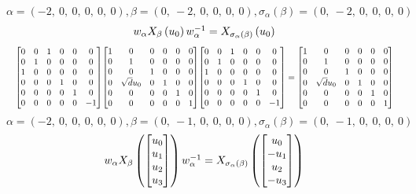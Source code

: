 \documentclass[11pt]{article}
\theoremstyle{definition}
\begin{document}
\[
\alpha = \left( -2, \  0, \  0, \  0, \  0, \  0\right), \beta = \left( 0, \  -2, \  0, \  0, \  0, \  0\right), \sigma_{\alpha}(\beta) = \left( 0, \  -2, \  0, \  0, \  0, \  0\right)
\]
\[
\scaletoalign{\textwidth}{w_{\alpha} X_{\beta}\left(u_{0}\right) w_{\alpha}^{-1} = X_{\sigma_{\alpha}\left(\beta\right)}\left(u_{0}\right)}
\]
\[
\scaletoalign{\textwidth}{{\left[\begin{matrix}0 & 0 & 1 & 0 & 0 & 0\\0 & 1 & 0 & 0 & 0 & 0\\1 & 0 & 0 & 0 & 0 & 0\\0 & 0 & 0 & 1 & 0 & 0\\0 & 0 & 0 & 0 & 1 & 0\\0 & 0 & 0 & 0 & 0 & -1\end{matrix}\right]} {\left[\begin{matrix}1 & 0 & 0 & 0 & 0 & 0\\0 & 1 & 0 & 0 & 0 & 0\\0 & 0 & 1 & 0 & 0 & 0\\0 & \sqrt{d} u_{0} & 0 & 1 & 0 & 0\\0 & 0 & 0 & 0 & 1 & 0\\0 & 0 & 0 & 0 & 0 & 1\end{matrix}\right]} {\left[\begin{matrix}0 & 0 & 1 & 0 & 0 & 0\\0 & 1 & 0 & 0 & 0 & 0\\1 & 0 & 0 & 0 & 0 & 0\\0 & 0 & 0 & 1 & 0 & 0\\0 & 0 & 0 & 0 & 1 & 0\\0 & 0 & 0 & 0 & 0 & -1\end{matrix}\right]} = {\left[\begin{matrix}1 & 0 & 0 & 0 & 0 & 0\\0 & 1 & 0 & 0 & 0 & 0\\0 & 0 & 1 & 0 & 0 & 0\\0 & \sqrt{d} u_{0} & 0 & 1 & 0 & 0\\0 & 0 & 0 & 0 & 1 & 0\\0 & 0 & 0 & 0 & 0 & 1\end{matrix}\right]}}
\]
\[
\alpha = \left( -2, \  0, \  0, \  0, \  0, \  0\right), \beta = \left( 0, \  -1, \  0, \  0, \  0, \  0\right), \sigma_{\alpha}(\beta) = \left( 0, \  -1, \  0, \  0, \  0, \  0\right)
\]
\[
\scaletoalign{\textwidth}{w_{\alpha} X_{\beta}\left(\left[\begin{matrix}u_{0}\\u_{1}\\u_{2}\\u_{3}\end{matrix}\right]\right) w_{\alpha}^{-1} = X_{\sigma_{\alpha}\left(\beta\right)}\left(\left[\begin{matrix}u_{0}\\- u_{1}\\u_{2}\\- u_{3}\end{matrix}\right]\right)}
\]
\end{document}
